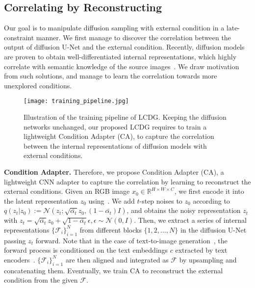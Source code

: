 \documentclass{article}
\begin{document}
\subsection{Correlating by Reconstructing}
\label{section:condition adapter}



Our goal is to manipulate diffusion sampling with external condition in a late-constraint manner. We first manage to discover the correlation between the output of diffusion U-Net and the external condition. Recently, diffusion models are proven to obtain well-differentiated internal representations, which highly correlate with semantic knowledge of the source images~\cite{baranchuk2021label, xu2023open}. We draw motivation from such solutions, and manage to learn the correlation towards more unexplored conditions.

\begin{figure*}[t!]
  \label{figure:training pipeline}
  \centering
  \texttt{[image: training\_pipeline.jpg]} \vspace{-1em}
  \caption{Illustration of the training pipeline of LCDG. Keeping the diffusion networks unchanged, our proposed LCDG requires to train a lightweight Condition Adapter (CA), to capture the correlation between the internal representations of diffusion models with external conditions.}
  \vspace{-1em}
  \end{figure*}

\textbf{Condition Adapter.} Therefore, we propose Condition Adapter (CA), a lightweight CNN adapter to capture the correlation by learning to reconstruct the external conditions. Given an RGB image $x_0 \in \mathbb{R}^{H \times W \times C}$, we first encode it into the latent representation $z_0$ using~\cite{esser2021taming}. We add $t$-step noises to $z_0$ according to $q(z_t|z_0):=\mathcal{N}(z_t;\sqrt{\bar{\alpha_t}}z_0, (1 - \bar{\alpha_t})I)$, and obtains the noisy representation $z_t$ with $z_t=\sqrt{\bar{\alpha_t}}z_0 + \sqrt{1 - \bar{\alpha_t}}\epsilon, \epsilon \sim \mathcal{N}(0, I)$. Then, we extract a series of internal representations $\{\mathcal{F}_i\}^N_{i=1}$ from different blocks $\{1, 2, \dots, N\}$ in the diffusion U-Net passing $z_t$ forward. Note that in the case of text-to-image generation~\cite{rombach2022high}, the forward process is conditioned on the text embeddings $c$ extracted by text encoders~\cite{radford2021learning, cherti2022reproducible}. $\{\mathcal{F}_i\}^N_{i=1}$ are then aligned and integrated as $\mathcal{F}$ by upsampling and concatenating them. Eventually, we train CA to reconstruct the external condition from the given $\mathcal{F}$.
\end{document}

